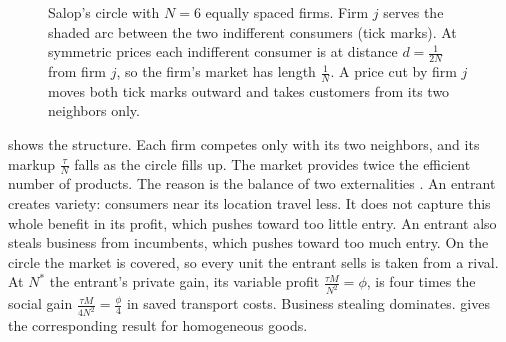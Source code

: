 \begin{figure}[htbp]
\centering
{}
\caption{Salop's circle with $N = 6$ equally spaced firms. Firm $j$ serves the shaded arc between the two
indifferent consumers (tick marks). At symmetric prices each indifferent consumer is at distance
$d = \frac{1}{2N}$ from firm $j$, so the firm's market has length $\frac{1}{N}$. A price cut by firm $j$ moves
both tick marks outward and takes customers from its two neighbors only.}
\label{fig:04-salop}
\end{figure}

 shows the structure. Each firm competes only with its two neighbors, and its markup
$\frac{\tau}{N}$ falls as the circle fills up. The market provides twice the efficient number of products. The reason
is the balance of two externalities \citep{Spence1976,DixitStiglitz1977,MankiwWhinston1986}. An entrant creates
variety: consumers near its location travel less. It does not capture this whole benefit in its profit, which pushes
toward too little entry. An entrant also steals business from incumbents, which pushes toward too much entry. On the
circle the market is covered, so every unit the entrant sells is taken from a rival. At $N^*$ the entrant's private
gain, its variable profit $\frac{\tau M}{N^2} = \phi$, is four times the social gain $\frac{\tau M}{4N^2} = \frac{\phi}{4}$
in saved transport costs. Business stealing dominates.  gives the corresponding result for
homogeneous goods.

